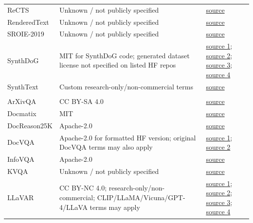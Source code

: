 \begin{longtable}{@{}>{\raggedright\arraybackslash}p{}>{\raggedright\arraybackslash}p{}>{\raggedright\arraybackslash}p{}@{}}
ReCTS & Unknown / not publicly specified & \href{https://drive.google.com/file/d/1orMtLhJt3rQl3pMoLm31eh-SmDG74W1K/view}{source} \\
RenderedText & Unknown / not publicly specified & \href{https://huggingface.co/datasets/wendlerc/RenderedText}{source} \\
SROIE-2019 & Unknown / not publicly specified & \href{https://huggingface.co/datasets/priyank-m/SROIE_2019_text_recognition}{source} \\
SynthDoG & MIT for SynthDoG code; generated dataset license not specified on listed HF repos & \href{https://huggingface.co/datasets/naver-clova-ix/synthdog-en}{source 1}; \href{https://huggingface.co/datasets/naver-clova-ix/synthdog-zh}{source 2}; \href{https://huggingface.co/datasets/naver-clova-ix/synthdog-ja}{source 3}; \href{https://huggingface.co/datasets/naver-clova-ix/synthdog-ko}{source 4} \\
SynthText & Custom research-only/non-commercial terms & \href{https://www.kaggle.com/datasets/wassefy/synthtext}{source} \\
\midrule
\rowcolor{instructcolor}\multicolumn{3}{l}{\textit{OCR QA}} \\
ArXivQA & CC BY-SA 4.0 & \href{https://huggingface.co/datasets/MMInstruction/ArxivQA}{source} \\
Docmatix & MIT & \href{https://huggingface.co/datasets/HuggingFaceM4/Docmatix}{source} \\
DocReason25K & Apache-2.0 & \href{https://huggingface.co/datasets/mPLUG/DocReason25K}{source} \\
DocVQA & Apache-2.0 for formatted HF version; original DocVQA terms may also apply & \href{https://huggingface.co/datasets/nyu-visionx/Cambrian-10M/resolve/main/docvqa.tar.gz}{source 1}; \href{https://huggingface.co/datasets/nyu-visionx/Cambrian-10M/resolve/main/jsons/Cambrian10M.jsonl}{source 2} \\
InfoVQA & Apache-2.0 & \href{https://huggingface.co/datasets/LIME-DATA/infovqa}{source} \\
KVQA & Unknown / not publicly specified & \href{https://huggingface.co/datasets/wusize/kvqa}{source} \\
LLaVAR & CC BY-NC 4.0; research-only/non-commercial; CLIP/LLaMA/Vicuna/GPT-4/LLaVA terms may apply & \href{https://drive.google.com/uc?id=1zWpqnAcaG_dUwkJJUvP9FH9zq__c-ODY}{source 1}; \href{https://drive.google.com/uc?id=1Ms7OCjcFQ18Whmujszpc9bTp0Jy0Dye4}{source 2}; \href{https://drive.google.com/uc?id=1_GCHFwrPGjp-9tZlDBwVkdz-L1ymchKY}{source 3}; \href{https://drive.google.com/uc?id=1NHO8lly6pUo-fdyOAyWeGiQJWRb9qggk}{source 4} \\

\end{longtable}
